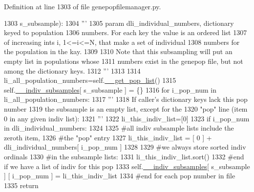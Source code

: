Definition at line 1303 of file genepopfilemanager.\+py.


\begin{DoxyCode}
1303             s\_subsample):
1304         \textcolor{stringliteral}{'''}
1305 \textcolor{stringliteral}{        param dli\_individual\_numbers, dictionary keyed to population}
1306 \textcolor{stringliteral}{                numbers.  For each key the value is an ordered list}
1307 \textcolor{stringliteral}{                of increasing ints i, 1<=i<=N, that make a set of individual}
1308 \textcolor{stringliteral}{                numbers for the population in the kay.}
1309 \textcolor{stringliteral}{}
1310 \textcolor{stringliteral}{        Note that this subsampling will put an empty list in populations whose}
1311 \textcolor{stringliteral}{        numbers exist in the genepop file, but not among the dictionary keys.}
1312 \textcolor{stringliteral}{        '''}
1313 
1314         li\_all\_population\_numbers=self.\hyperlink{classnegui_1_1genepopfilemanager_1_1GenepopFileManager_a0cd3178624c652968b4d319f12e5df6e}{\_\_get\_pop\_list}()
1315         self.\hyperlink{classnegui_1_1genepopfilemanager_1_1GenepopFileManager_a1e8379bcee4902ca9314ff53fcb71644}{\_\_indiv\_subsamples}[ s\_subsample ] = \{\}
1316         \textcolor{keywordflow}{for} i\_pop\_num \textcolor{keywordflow}{in} li\_all\_population\_numbers:
1317             \textcolor{stringliteral}{'''}
1318 \textcolor{stringliteral}{            If caller's dictionary keys lack this pop number}
1319 \textcolor{stringliteral}{            the subsample is an empty list, except for the}
1320 \textcolor{stringliteral}{            "pop" line (item 0 in any given indiv list):}
1321 \textcolor{stringliteral}{            '''}
1322             li\_this\_indiv\_list=[0]
1323             \textcolor{keywordflow}{if} i\_pop\_num \textcolor{keywordflow}{in} dli\_individual\_numbers:
1324                 
1325                 \textcolor{comment}{#all indiv subsample lists include the zeroth item,}
1326                 \textcolor{comment}{#the "pop" entry}
1327                 li\_this\_indiv\_list =  [ 0 ] +  dli\_individual\_numbers[ i\_pop\_num ] 
1328 
1329                 \textcolor{comment}{#we always store sorted indiv ordinals}
1330                 \textcolor{comment}{#in the subsample lists:}
1331                 li\_this\_indiv\_list.sort()
1332             \textcolor{comment}{#end if we have a list of indiv for this pop}
1333             self.\hyperlink{classnegui_1_1genepopfilemanager_1_1GenepopFileManager_a1e8379bcee4902ca9314ff53fcb71644}{\_\_indiv\_subsamples}[ s\_subsample ] [ i\_pop\_num ] = li\_this\_indiv\_list
1334         \textcolor{comment}{#end for each pop number in file}
1335         \textcolor{keywordflow}{return}
\end{DoxyCode}
